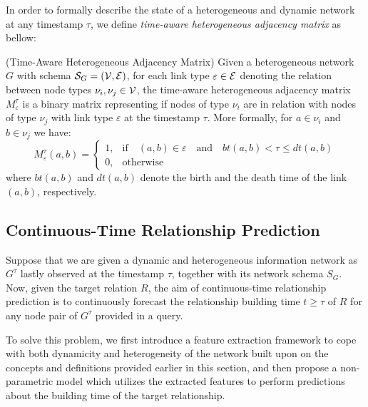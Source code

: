 {\color{red}In order to formally describe the state of a heterogeneous and dynamic network at any timestamp $\tau$, we define \emph{time-aware heterogeneous adjacency matrix} as bellow:
	
	\begin{definition}{(Time-Aware Heterogeneous Adjacency Matrix)}
		Given a heterogeneous network $G$ with schema $\mathcal{S}_G=(\mathcal{V}, \mathcal{E})$, for each link type $\varepsilon\in\mathcal{E}$ denoting the relation between node types $\nu_i,\nu_j\in\mathcal{V}$, the time-aware heterogeneous adjacency matrix $M^\tau_{\varepsilon}$ is a binary matrix representing if nodes of type $\nu_i$ are in relation with nodes of type $\nu_j$ with link type $\varepsilon$ at the timestamp $\tau$. More formally, for $a\in\nu_i$ and $b\in\nu_j$ we have:
		\[M^\tau_{\varepsilon}(a,b)=\begin{cases} 
		1, & \text{if}\quad(a,b)\in\varepsilon\quad\text{and}\quad bt(a,b) < \tau \le dt(a,b) \\
		0, & \text{otherwise}
		\end{cases}
		\]
		where $bt(a,b)$ and $dt(a,b)$ denote the birth and the death time of the link $(a,b)$, respectively.
	\end{definition}
}

\subsection{Continuous-Time Relationship Prediction}
Suppose that we are given a dynamic and heterogeneous information network as $G^{\tau}$ lastly observed at the timestamp $\tau$, together with its network schema $S_G$. Now, given the target relation $R$, the aim of continuous-time relationship prediction is to continuously forecast the relationship building time $t\ge \tau$ of $R$ for any node pair of $G^{\tau}$ provided in a query.

To solve this problem, we first introduce a feature extraction framework to cope with both dynamicity and heterogeneity of the network built upon on the concepts and definitions provided earlier in this section, and then propose a non-parametric model which utilizes the extracted features to perform predictions about the building time of the target relationship.
